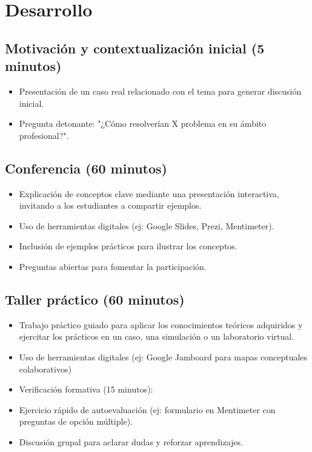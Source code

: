 \section{Desarrollo}

\subsection*{Motivación y contextualización inicial (5 minutos)}
\begin{itemize}
    \item Presentación de un caso real relacionado con el tema para generar discusión inicial.
    \item Pregunta detonante: "¿Cómo resolverían X problema en su ámbito profesional?".
\end{itemize}

\subsection*{Conferencia (60 minutos)}
\begin{itemize}
    \item Explicación de conceptos clave mediante una presentación interactiva, invitando a los estudiantes a compartir ejemplos.
    \item Uso de herramientas digitales (ej: Google Slides, Prezi, Mentimeter).
    \item Inclusión de ejemplos prácticos para ilustrar los conceptos.
    \item Preguntas abiertas para fomentar la participación.
\end{itemize}

\subsection*{Taller práctico (60 minutos)}
\begin{itemize}
    \item Trabajo práctico guiado para aplicar los conocimientos teóricos adquiridos y ejercitar los prácticos en un caso, una simulación o un laboratorio virtual.
    \item Uso de herramientas digitales (ej: Google Jamboard para mapas conceptuales colaborativos)
    \item Verificación formativa (15 minutos):
    \item Ejercicio rápido de autoevaluación (ej: formulario en Mentimeter con preguntas de opción múltiple).
    \item Discusión grupal para aclarar dudas y reforzar aprendizajes.
\end{itemize}